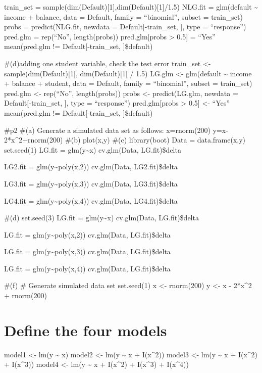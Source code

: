 \documentclass[
]{article}
\begin{document}
train\_set = sample(dim(Default){[}1{]},dim(Default){[}1{]}/1.5) NLG.fit
= glm(default \textasciitilde{} income + balance, data = Default, family
= ``binomial'', subset = train\_set) probs = predict(NLG.fit, newdata =
Default{[}-train\_set, {]}, type = ``response'') pred.glm = rep(``No'',
length(probs)) pred.glm{[}probs \textgreater{} 0.5{]} = ``Yes''
mean(pred.glm != Default{[}-train\_set, {]}\$default)

\#(d)adding one student variable, check the test error train\_set
\textless- sample(dim(Default){[}1{]}, dim(Default){[}1{]} / 1.5) LG.glm
\textless- glm(default \textasciitilde{} income + balance + student,
data = Default, family = ``binomial'', subset = train\_set) pred.glm
\textless- rep(``No'', length(probs)) probs \textless- predict(LG.glm,
newdata = Default{[}-train\_set, {]}, type = ``response'')
pred.glm{[}probs \textgreater{} 0.5{]} \textless- ``Yes'' mean(pred.glm
!= Default{[}-train\_set, {]}\$default)

\#p2 \#(a) Generate a simulated data set as follows: x=rnorm(200)
y=x-2*x\^{}2+rnorm(200) \#(b) plot(x,y) \#(c) library(boot) Data =
data.frame(x,y) set.seed(1) LG.fit = glm(y\textasciitilde x)
cv.glm(Data, LG.fit)\$delta

LG2.fit = glm(y\textasciitilde poly(x,2)) cv.glm(Data, LG2.fit)\$delta

LG3.fit = glm(y\textasciitilde poly(x,3)) cv.glm(Data, LG3.fit)\$delta

LG4.fit = glm(y\textasciitilde poly(x,4)) cv.glm(Data, LG4.fit)\$delta

\#(d) set.seed(3) LG.fit = glm(y\textasciitilde x) cv.glm(Data,
LG.fit)\$delta

LG.fit = glm(y\textasciitilde poly(x,2)) cv.glm(Data, LG.fit)\$delta

LG.fit = glm(y\textasciitilde poly(x,3)) cv.glm(Data, LG.fit)\$delta

LG.fit = glm(y\textasciitilde poly(x,4)) cv.glm(Data, LG.fit)\$delta

\#(f) \# Generate simulated data set set.seed(1) x \textless- rnorm(200)
y \textless- x - 2*x\^{}2 + rnorm(200)

\hypertarget{define-the-four-models}{%
\section{Define the four models}\label{define-the-four-models}}

model1 \textless- lm(y \textasciitilde{} x) model2 \textless- lm(y
\textasciitilde{} x + I(x\^{}2)) model3 \textless- lm(y
\textasciitilde{} x + I(x\^{}2) + I(x\^{}3)) model4 \textless- lm(y
\textasciitilde{} x + I(x\^{}2) + I(x\^{}3) + I(x\^{}4))
\end{document}

